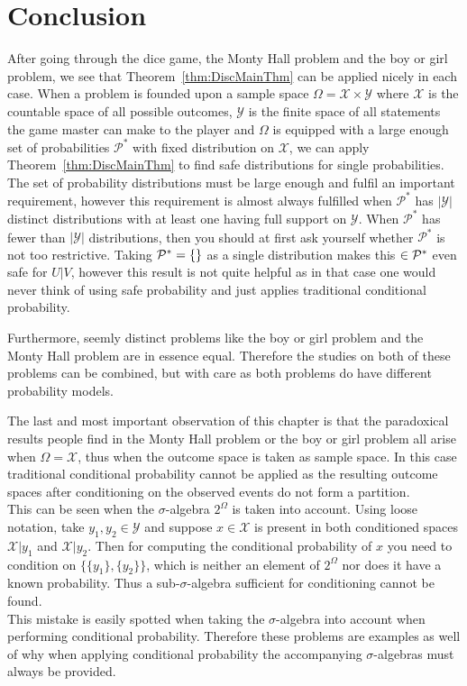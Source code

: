\documentclass[a4paper]{report}
\theoremstyle{plain}
\theoremstyle{definition}
\theoremstyle{remark}
\numberwithin{equation}{chapter}
\let\P\relax
\DeclareMathOperator{\P}{\mathbb{P}}
\DeclareMathOperator{\1}{\mathbbm{1}}
\newcommand{\X}{\mathcal{X}}
\newcommand{\Y}{\mathcal{Y}}
\newcommand{\Pmod}{\mathcal{P}^*}
\begin{document}
\section{Conclusion}\label{sec:DiscConcl}
After going through the dice game, the Monty Hall problem and the boy or girl problem, we see that Theorem~\ref{thm:DiscMainThm} can be applied nicely in each case. When a problem is founded upon a sample space $\Omega=\X\times\Y$ where $\X$ is the countable space of all possible outcomes, $\Y$ is the finite space of all statements the game master can make to the player and $\Omega$ is equipped with a large enough set of probabilities $\Pmod$ with fixed distribution on $\X$, we can apply Theorem~\ref{thm:DiscMainThm} to find safe distributions for single probabilities. The set of probability distributions must be large enough and fulfil an important requirement, however this requirement is almost always fulfilled when $\Pmod$ has $|\Y|$ distinct distributions with at least one having full support on $\Y$. When $\Pmod$ has fewer than $|\Y|$ distributions, then you should at first ask yourself whether $\Pmod$ is not too restrictive. Taking $\Pmod=\{\P\}$ as a single distribution makes this $\P\in\Pmod$ even safe for $U|V$, however this result is not quite helpful as in that case one would never think of using safe probability and just applies traditional conditional probability.

Furthermore, seemly distinct problems like the boy or girl problem and the Monty Hall problem are in essence equal. Therefore the studies on both of these problems can be combined, but with care as both problems do have different probability models.

The last and most important observation of this chapter is that the paradoxical results people find in the Monty Hall problem or the boy or girl problem all arise when $\Omega=\X$, thus when the outcome space is taken as sample space. In this case traditional conditional probability cannot be applied as the resulting outcome spaces after conditioning on the observed events do not form a partition.\\
This can be seen when the $\sigma$-algebra $2^{\Omega}$ is taken into account. Using loose notation, take $y_1,y_2\in\Y$ and suppose $x\in\X$ is present in both conditioned spaces $\X|y_1$ and $\X|y_2$. Then for computing the conditional probability of $x$ you need to condition on $\{\{y_1\},\{y_2\}\}$, which is neither an element of $2^\Omega$ nor does it have a known probability. Thus a sub-$\sigma$-algebra sufficient for conditioning cannot be found.\\
This mistake is easily spotted when taking the $\sigma$-algebra into account when performing conditional probability. Therefore these problems are examples as well of why when applying conditional probability the accompanying $\sigma$-algebras must always be provided.
\end{document}
